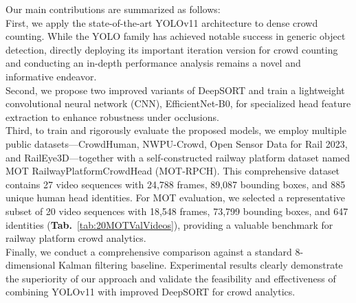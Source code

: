 Our main contributions are summarized as follows:\\
First, we apply the state-of-the-art YOLOv11 architecture to dense crowd counting. While the YOLO family has achieved notable success in generic object detection, directly deploying its important iteration version for crowd counting and conducting an in-depth performance analysis remains a novel and informative endeavor.\\

Second, we propose two improved variants of DeepSORT and train a lightweight convolutional neural network (CNN), EfficientNet-B0, for specialized head feature extraction to enhance robustness under occlusions.\\

Third, to train and rigorously evaluate the proposed models, we employ multiple public datasets—CrowdHuman\cite{shao2018crowdhuman}, NWPU-Crowd\cite{nwpcrowd}, Open Sensor Data for Rail 2023\cite{OpenSensorDataforRail2023}, and RailEye3D\cite{RailEye3D_Dataset}—together with a self-constructed railway platform dataset named MOT RailwayPlatformCrowdHead (MOT-RPCH). This comprehensive dataset contains 27 video sequences with 24,788 frames, 89,087 bounding boxes, and 885 unique human head identities. For MOT evaluation, we selected a representative subset of 20 video sequences with 18,548 frames, 73,799 bounding boxes, and 647 identities (\textbf{Tab.}~\ref{tab:20MOTValVideos}), providing a valuable benchmark for railway platform crowd analytics.\\

Finally, we conduct a comprehensive comparison against a standard 8-dimensional Kalman filtering baseline. Experimental results clearly demonstrate the superiority of our approach and validate the feasibility and effectiveness of combining YOLOv11 with improved DeepSORT for crowd analytics.

